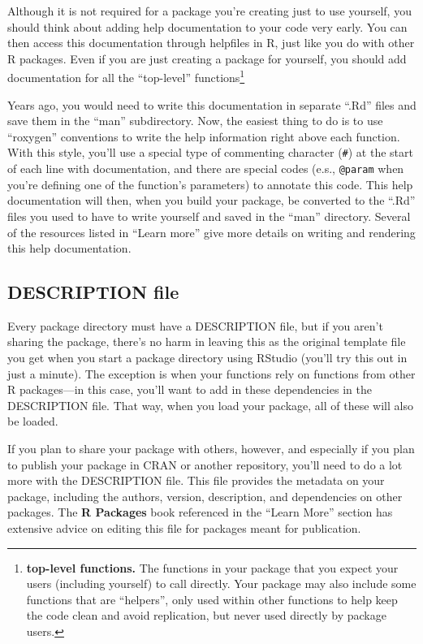 \documentclass[]{tufte-book}
\begin{document}
Although it is not required for a package you're creating just to use yourself, you
should think about adding help documentation to your code very early. You can then
access this documentation through helpfiles in R, just like you do with other R packages.
Even if you are just creating a package for yourself, you should add documentation
for all the ``top-level'' functions\footnote{\textbf{top-level functions.} The functions in your package
  that you expect your users (including yourself) to call directly. Your package may also
  include some functions that are ``helpers'', only used within other functions to help
  keep the code clean and avoid replication, but never used directly by package users.}

Years ago, you would need to write this documentation in separate ``.Rd'' files
and save them in the ``man'' subdirectory. Now, the easiest thing to do is to use
``roxygen'' conventions to write the help information right above each function.
With this style, you'll use a special type of commenting character (\texttt{\#\textquotesingle{}}) at the
start of each line with documentation, and there are special codes (e.s.,
\texttt{@param} when you're defining one of the function's parameters) to annotate this
code. This help documentation will then, when you build your package, be
converted to the ``.Rd'' files you used to have to write yourself and saved in the
``man'' directory. Several of the resources listed in ``Learn more'' give more
details on writing and rendering this help documentation.

\hypertarget{description-file}{%
\subsection{DESCRIPTION file}\label{description-file}}

Every package directory must have a DESCRIPTION file, but if you aren't sharing
the package, there's no harm in leaving this as the original template file you
get when you start a package directory using RStudio (you'll try this out in
just a minute). The exception is when your functions rely on functions from
other R packages---in this case, you'll want to add in these dependencies in the
DESCRIPTION file. That way, when you load your package, all of these will also
be loaded.

If you plan to share your package with others, however, and especially if you
plan to publish your package in CRAN or another repository, you'll need to do
a lot more with the DESCRIPTION file. This file provides the metadata on your package,
including the authors, version, description, and dependencies on other packages.
The \textbf{R Packages} book referenced in the ``Learn More'' section has extensive advice
on editing this file for packages meant for publication.
\end{document}
